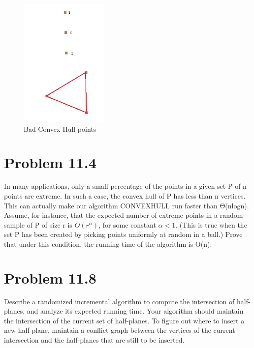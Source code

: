 \documentclass[11pt,psfig]{article}
\begin{document}
\begin{figure}[H]
\centering
\includegraphics[height=2.5in]{hw8prob1diagram.jpg}
\caption{Bad Convex Hull points}
\end{figure}

\newpage

\section*{Problem 11.4}

In many applications, only a small percentage of the points in a given set
P of n points are extreme. In such a case, the convex hull of P has less
than n vertices. This can actually make our algorithm CONVEXHULL
run faster than Θ(nlogn).\\

Assume, for instance, that the expected number of extreme points in a
random sample of P of size r is $O(r^\alpha)$, for some constant $\alpha < 1$. (This
is true when the set P has been created by picking points uniformly at
random in a ball.) Prove that under this condition, the running time of
the algorithm is O(n).

\section*{Problem 11.8}

Describe a randomized incremental algorithm to compute the intersection
of half-planes, and analyze its expected running time. Your algorithm
should maintain the intersection of the current set of half-planes.
To figure out where to insert a new half-plane, maintain a conflict graph
between the vertices of the current intersection and the half-planes that
are still to be inserted.
\end{document}
